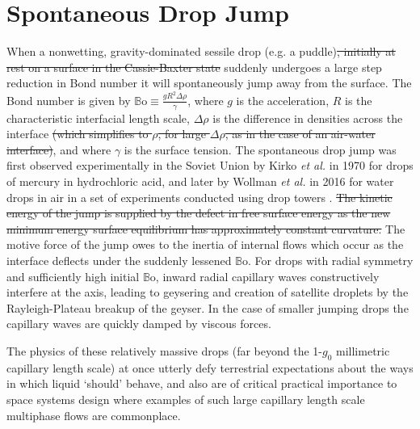 \documentclass[aip,reprint, floatfix]{revtex4-1}
\begin{document}
\pacs{}%

\maketitle %

\section{Spontaneous Drop Jump}
When a nonwetting, gravity-dominated sessile drop (e.g. a puddle)\sout{, initially at rest on a surface in the Cassie-Baxter state} suddenly undergoes a large step reduction in Bond number it will spontaneously jump away from the surface. The Bond number is given by $\mathbb{B}\mbox{o} \equiv \frac{g R^2 \Delta \rho}{\gamma}$, where $g$ is the acceleration, $R$ is the characteristic interfacial length scale, $\Delta \rho$ is the difference in densities across the interface \sout{(which simplifies to $\rho$, for large $\Delta \rho$, as in the case of an air-water interface)}, and where $\gamma$ is the surface tension. The spontaneous drop jump was first observed experimentally in the Soviet Union by Kirko \emph{et al.} \cite{kirko_phenomenon_1970} in 1970 for drops of mercury in hydrochloric acid, and later by Wollman \emph{et al.} in 2016 for water drops in air in a set of experiments conducted using drop towers \cite{wollman_more_2016}. \sout{The kinetic energy of the jump is supplied by the defect in free surface energy as the new minimum energy surface equilibrium has approximately constant curvature.} The motive force of the jump owes to the inertia of internal flows which occur as the interface deflects under the suddenly lessened $\mathbb{B}\mbox{o}$. For drops with radial symmetry and sufficiently high initial $\mathbb{B}\mbox{o}$, inward radial capillary waves constructively interfere at the axis, leading to geysering and creation of satellite droplets by the Rayleigh-Plateau breakup of the geyser. In the case of smaller jumping drops the capillary waves are quickly damped by viscous forces.

The physics of these relatively massive drops (far beyond the 1-$g_0$ millimetric capillary length scale) at once utterly defy terrestrial expectations about the ways in which liquid `should' behave, and also are of critical practical importance to space systems design where examples of such large capillary length scale multiphase flows are commonplace.
\end{document}

